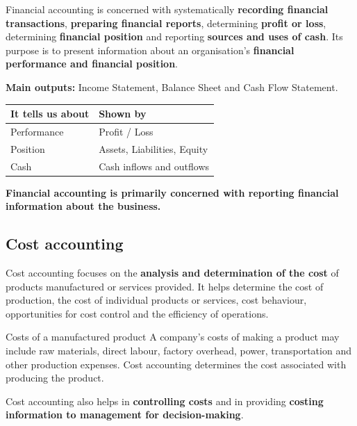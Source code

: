 \documentclass[11pt,a4paper]{article}
\begin{document}
Financial accounting is concerned with systematically \textbf{recording financial
transactions}, \textbf{preparing financial reports}, determining \textbf{profit or loss},
determining \textbf{financial position} and reporting \textbf{sources and uses of cash}. Its purpose is
to present information about an organisation's \textbf{financial performance and financial
position}.

\textbf{Main outputs:} Income Statement, Balance Sheet and Cash Flow Statement.

\begin{center}
\small
\begin{tabularx}{\textwidth}{@{}l Y@{}}
\toprule
{}\textbf{It tells us about} & \textbf{Shown by}\\
\midrule
Performance & Profit / Loss\\
Position & Assets, Liabilities, Equity\\
Cash & Cash inflows and outflows\\
\bottomrule
\end{tabularx}
\end{center}

\begin{keybox}
\textbf{Financial accounting is primarily concerned with reporting financial information about the business.}
\end{keybox}

\subsection{Cost accounting}

Cost accounting focuses on the \textbf{analysis and determination of the cost} of products
manufactured or services provided. It helps determine the cost of production, the cost of
individual products or services, cost behaviour, opportunities for cost control and the
efficiency of operations.

\begin{exbox}{Costs of a manufactured product}
A company's costs of making a product may include raw materials, direct labour, factory
overhead, power, transportation and other production expenses. Cost accounting determines the
cost associated with producing the product.
\end{exbox}

Cost accounting also helps in \textbf{controlling costs} and in providing \textbf{costing
information to management for decision-making}.
\end{document}
